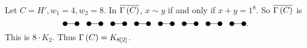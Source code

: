 \begin{example*}
Let $ C = H', w_1 = 4, w_2 = 8 $. In $ \overline{\Gamma\br{C}} $, $ x \sim y $ if and only if $ x + y = 1^8 $. So $ \overline{\Gamma\br{C}} $ is
$$
\begin{tikzpicture}
\fill (0, 0) circle (0.1);
\fill (0.5, 0) circle (0.1);
\fill (1, 0) circle (0.1);
\fill (1.5, 0) circle (0.1);
\fill (2, 0) circle (0.1);
\fill (2.5, 0) circle (0.1);
\fill (3, 0) circle (0.1);
\fill (3.5, 0) circle (0.1);
\fill (4, 0) circle (0.1);
\fill (4.5, 0) circle (0.1);
\fill (5, 0) circle (0.1);
\fill (5.5, 0) circle (0.1);
\fill (6, 0) circle (0.1);
\fill (6.5, 0) circle (0.1);
\fill (7, 0) circle (0.1);
\fill (7.5, 0) circle (0.1);
\draw (0, 0) to (0.5, 0);
\draw (1, 0) to (1.5, 0);
\draw (2, 0) to (2.5, 0);
\draw (3, 0) to (3.5, 0);
\draw (4, 0) to (4.5, 0);
\draw (5, 0) to (5.5, 0);
\draw (6, 0) to (6.5, 0);
\draw (7, 0) to (7.5, 0);
\end{tikzpicture}.
$$
This is $ 8 \cdot K_2 $. Thus $ \Gamma\br{C} = K_{8\sbr{2}} $.
\end{example*}

